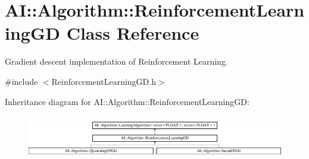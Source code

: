 \hypertarget{classAI_1_1Algorithm_1_1ReinforcementLearningGD}{\section{A\+I\+:\+:Algorithm\+:\+:Reinforcement\+Learning\+G\+D Class Reference}
\label{classAI_1_1Algorithm_1_1ReinforcementLearningGD}
}


Gradient descent implementation of Reinforcement Learning.  




{\ttfamily \#include $<$Reinforcement\+Learning\+G\+D.\+h$>$}

Inheritance diagram for A\+I\+:\+:Algorithm\+:\+:Reinforcement\+Learning\+G\+D\+:\begin{figure}[H]
\begin{center}
\leavevmode
\includegraphics[height=1.931035cm]{classAI_1_1Algorithm_1_1ReinforcementLearningGD}
\end{center}
\end{figure}
